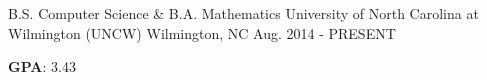 

\begin{cventries}

  \cventry
    {B.S. Computer Science \& B.A. Mathematics} %
    {University of North Carolina at Wilmington (UNCW)} %
    {Wilmington, NC} %
    {Aug. 2014 - PRESENT} %
    {
      \begin{cvitems}
        \item {\textbf{GPA}: 3.43}
      \end{cvitems}
    }
\end{cventries}
